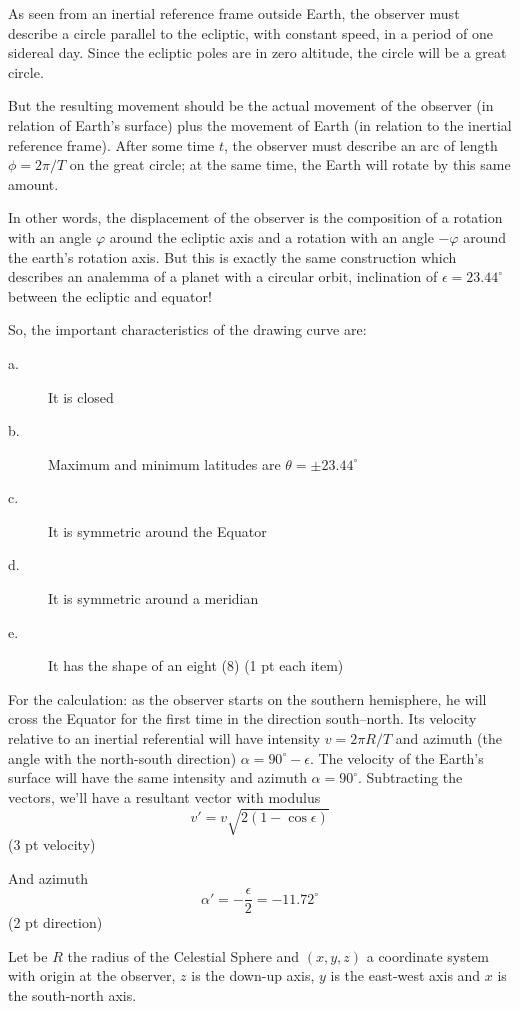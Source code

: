 As seen from an inertial reference frame outside Earth, the observer must
describe a circle parallel to the ecliptic, with constant speed, in a period
of one sidereal day. Since the ecliptic poles are in zero altitude, the circle
will be a great circle.

But the resulting movement should be the actual movement of the observer (in
relation of Earth's surface) plus the movement of Earth (in relation to the
inertial reference frame). After some time $t$, the observer must describe an
arc of length $\phi = 2\pi/T$ %
on the great circle; at the same time, the Earth will rotate by this same
amount.

In other words, the displacement of the observer is the composition of a
rotation with an angle $\varphi$ around the ecliptic axis and a rotation with
an angle $-\varphi$ around the earth's rotation axis. But this is exactly the
same construction which describes an analemma of a planet with a circular
orbit, inclination of $\epsilon = 23.44^\circ$ between the ecliptic and
equator!

So, the important characteristics of the drawing curve are:
\begin{description}
\item[a.] It is closed
\item[b.] Maximum and minimum latitudes are $\theta = \pm 23.44^\circ$
\item[c.] It is symmetric around the Equator
\item[d.] It is symmetric around a meridian
\item[e.] It has the shape of an eight (8) \hfill(1 pt each item)
\end{description}

For the calculation: as the observer starts on the southern hemisphere, he
will cross the Equator for the first time in the direction south--north. Its
velocity relative to an inertial referential will have intensity
$v = 2\pi R/T$ and azimuth (the angle with the north-south direction)
$\alpha = 90^\circ - \epsilon$. The velocity of the Earth's surface will have
the same intensity and azimuth $\alpha = 90^\circ$. Subtracting the vectors,
we'll have a resultant vector with modulus
\[
  v' = v\sqrt{2(1 - \cos\epsilon)}
\]
\hfill(3 pt velocity)

And azimuth
\[
  \alpha' = -\frac{\epsilon}{2} = -11.72^\circ
\]
\hfill(2 pt direction)

Let be $R$ the radius of the Celestial Sphere and $(x, y, z)$ a coordinate
system with origin at the observer, $z$ is the down-up axis, $y$ is the
east-west axis and $x$ is the south-north axis.

